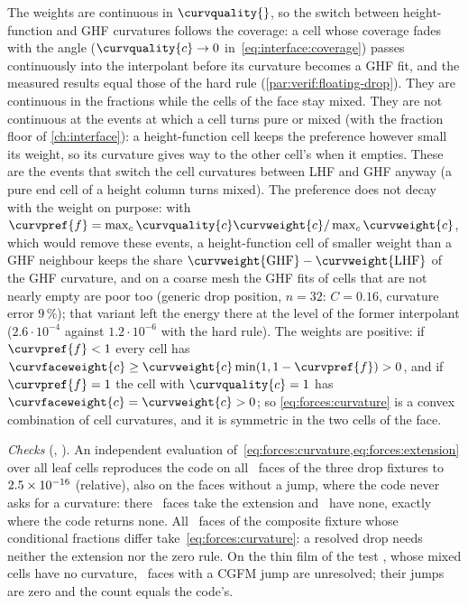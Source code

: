 The weights are continuous in $\curvquality{}$, so the switch between
height-function and GHF curvatures follows the coverage: a cell whose
coverage fades with the angle ($\curvquality{c}\to0$
in~\cref{eq:interface:coverage}) passes continuously into the interpolant
before its curvature becomes a GHF fit, and the measured results equal those
of the hard rule (\cref{par:verif:floating-drop}). They are continuous in the
fractions while the cells of the face stay mixed. They are not continuous at
the events at which a cell turns pure or mixed (with the fraction floor of
\cref{ch:interface}): a height-function cell keeps the preference however small
its weight, so its curvature gives way to the other cell's when it empties.
These are the events that switch the cell curvatures between LHF and GHF
anyway (a pure end cell of a height column turns mixed). The preference does
not decay with the weight on purpose: with $\curvpref{f}=\max_c
\curvquality{c}\curvweight{c}/\max_c\curvweight{c}$, which would remove these
events, a height-function cell of smaller weight than a GHF neighbour keeps
the share $\curvweight{\mathrm{GHF}}-\curvweight{\mathrm{LHF}}$ of the GHF
curvature, and on a coarse mesh the GHF fits of cells that are not nearly
empty are poor too (generic drop position, $n=32$: $C=0.16$, curvature error
$9\,\%$); that variant left the energy there at the level of the former
interpolant ($2.6\cdot10^{-4}$ against $1.2\cdot10^{-6}$ with the hard rule).
The weights are positive: if $\curvpref{f}<1$ every cell has
$\curvfaceweight{c}\ge\curvweight{c}\min(1,1-\curvpref{f})>0$, and if
$\curvpref{f}=1$ the cell with $\curvquality{c}=1$ has
$\curvfaceweight{c}=\curvweight{c}>0$; so \cref{eq:forces:curvature} is a
convex combination of cell curvatures, and it is symmetric in the two cells of
the face.

\emph{Checks} (, ). An
independent evaluation of~\cref{eq:forces:curvature,eq:forces:extension}
over all leaf cells reproduces the code on all \chkForceAllFaces\ faces of
the three drop fixtures to $2.5\times10^{-16}$ (relative), also on the faces
without a jump, where the code never asks for a curvature: there
\chkForceAllExtension\ faces take the extension and \chkForceAllUndefined\
have none, exactly where the code returns none. All
\chkForceNeighbourFaces\ faces of the composite fixture whose conditional
fractions differ take~\cref{eq:forces:curvature}: a resolved drop needs
neither the extension nor the zero rule. On the thin film of the test
,
whose mixed cells have no curvature, \chkForceFilmUnresolved\ faces with a
CGFM jump are unresolved; their jumps are zero and the count equals the
code's.

